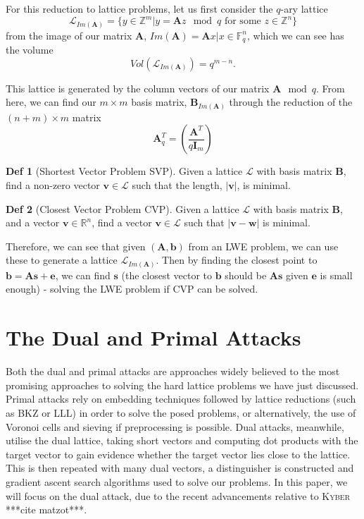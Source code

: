\documentclass[a4paper, 10pt]{article}
\theoremstyle{definition}
\newtheorem{definition}{Def}[section]
\begin{document}
For this reduction to lattice problems, let us first consider the  $q$-ary lattice
\[\mathcal{L}_{Im(\mathbf{A})}=\{y \in \mathbb{Z}^m | y=\mathbf{A}z\mod{q} \mbox{ for some } z \in \mathbb{Z}^n \}\]
from the image of our matrix $\mathbf{A}$, $Im(\mathbf{A})={\mathbf{A}x|x\in \mathbb{F}_q^n}$, which we can see has the volume
\[Vol(\mathcal{L}_{Im(\mathbf{A})})=q^{m-n}\text{.}\]

This lattice is generated by the column vectors of our matrix $\mathbf{A}\mod{q}$. From here, we can find our $m \times m$ basis matrix, $\textbf{B}_{Im(\textbf{A})}$ through the reduction of the $(n+m) \times m$ matrix
\[\mathbf{A}^T_q = (\frac{\mathbf{A}^T}{q\mathbf{I}_m})\]

\begin{definition}[Shortest Vector Problem \ac{SVP}]
    Given a lattice $\mathcal{L}$ with basis matrix $\textbf{B}$, find a non-zero vector $\mathbf{v} \in \mathcal{L}$ such that the length, $|\mathbf{v}|$, is minimal.
\end{definition}

\begin{definition}[Closest Vector Problem \ac{CVP}]
    Given a lattice $\mathcal{L}$ with basis matrix $\textbf{B}$, and a vector $\mathbf{v} \in \mathbb{R}^n$, find a vector $\mathbf{v} \in \mathcal{L}$ such that $|\mathbf{v} - \mathbf{w}|$ is minimal.
\end{definition}

Therefore, we can see that given $(\mathbf{A}, \mathbf{b})$ from an \ac{LWE} problem, we can use these to generate a lattice $\mathcal{L}_{Im(\mathbf{A})}$. Then by finding the closest point to $\mathbf{b} = \mathbf{As} + \mathbf{e}$, we can find $\mathbf{s}$ (the closest vector to $\mathbf{b}$ should be $\mathbf{As}$ given $\mathbf{e}$ is small enough) - solving the \ac{LWE} problem if \ac{CVP} can be solved.




\section{The Dual and Primal Attacks}

Both the dual and primal attacks are approaches widely believed to the most promising approaches to solving the hard lattice problems we have just discussed. Primal attacks rely on embedding techniques followed by lattice reductions (such as BKZ or LLL) in order to solve the posed problems, or alternatively, the use of Voronoi cells and sieving if preprocessing is possible. Dual attacks, meanwhile, utilise the dual lattice, taking short vectors and computing dot products with the target vector to gain evidence whether the target vector lies close to the lattice. This is then repeated with many dual vectors, a distinguisher is constructed and gradient ascent search algorithms used to solve our problems. In this paper, we will focus on the dual attack, due to the recent advancements relative to \textsc{Kyber} ***cite matzot***.
\end{document}
